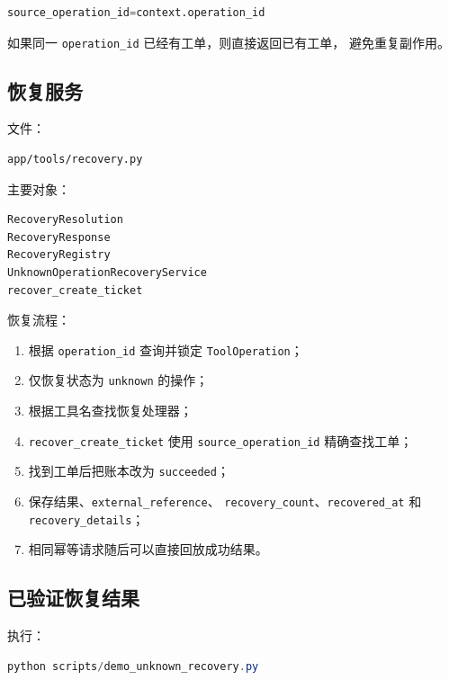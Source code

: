 \documentclass[11pt,a4paper]{ctexart}
\begin{document}
\begin{lstlisting}[language=Python]
source_operation_id=context.operation_id
\end{lstlisting}

如果同一 \texttt{operation\_id} 已经有工单，则直接返回已有工单，
避免重复副作用。

\subsection{恢复服务}

文件：

\begin{lstlisting}
app/tools/recovery.py
\end{lstlisting}

主要对象：

\begin{lstlisting}
RecoveryResolution
RecoveryResponse
RecoveryRegistry
UnknownOperationRecoveryService
recover_create_ticket
\end{lstlisting}

恢复流程：

\begin{enumerate}[leftmargin=2.2em]
  \item 根据 \texttt{operation\_id} 查询并锁定
        \texttt{ToolOperation}；
  \item 仅恢复状态为 \texttt{unknown} 的操作；
  \item 根据工具名查找恢复处理器；
  \item \texttt{recover\_create\_ticket} 使用
        \texttt{source\_operation\_id} 精确查找工单；
  \item 找到工单后把账本改为 \texttt{succeeded}；
  \item 保存结果、\texttt{external\_reference}、
        \texttt{recovery\_count}、\texttt{recovered\_at} 和
        \texttt{recovery\_details}；
  \item 相同幂等请求随后可以直接回放成功结果。
\end{enumerate}

\subsection{已验证恢复结果}

执行：

\begin{lstlisting}[language=PowerShell]
python scripts/demo_unknown_recovery.py
\end{lstlisting}
\end{document}
